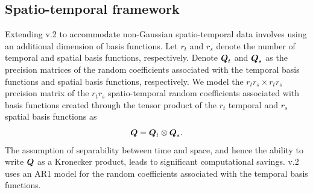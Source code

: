 \documentclass[article]{jss}
\def\mbf#1{{%
\mathchoice%
{\hbox{\boldmath$\displaystyle{#1}$}}%
{\hbox{\boldmath$\textstyle{#1}$}}%
{\hbox{\boldmath$\scriptstyle{#1}$}}%
{\hbox{\boldmath$\scriptscriptstyle{#1}$}}%
}}
\def\vec{\mbf}
\newcommand{\tp}{{\!\scriptscriptstyle \top}}
\begin{document}


\subsection{Spatio-temporal framework}\label{sec:spatio-temporal}

Extending  v.2 to accommodate non-Gaussian spatio-temporal data involves using an additional dimension of basis functions.
Let $r_t$ and $r_s$ denote the number of temporal and spatial basis functions, respectively. 
Denote $\vec{Q}_t$ and $\vec{Q}_s$ as the precision matrices of the random coefficients associated with the temporal basis functions and spatial basis functions, respectively. 
We model the $r_tr_s \times r_tr_s$ precision matrix  of the $r_tr_s$ spatio-temporal random coefficients associated with basis functions created through the tensor product of the $r_t$ temporal and $r_s$ spatial basis functions as
\[
\vec{Q} = \vec{Q}_t \otimes \vec{Q}_s.
\]
The assumption of separability between time and space, and hence the ability to write $\vec{Q}$ as a Kronecker product, leads to significant computational savings. 
 v.2 uses an AR1 model for the random coefficients associated with the temporal basis functions.
\end{document}
